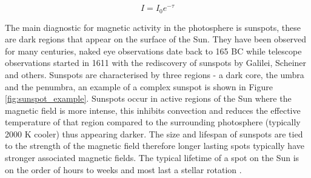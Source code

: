 \begin{equation}
    I = I_{0}e^{-\tau}
    \label{Eq:optical_depth_eq}
\end{equation}

The main diagnostic for magnetic activity in the photosphere is sunspots, these are dark regions that appear on the surface of the Sun. They have been observed for many centuries, naked eye observations date back to 165 BC \citep{Wittmann_1987} while telescope observations started in 1611 with the rediscovery of sunspots by Galilei, Scheiner and others. Sunspots are characterised by three regions - a dark core, the umbra and the penumbra, an example of a complex sunspot is shown in Figure \ref{fig:sunspot_example}. Sunspots occur in active regions of the Sun where the magnetic field is more intense, this inhibits convection and reduces the effective temperature of that region compared to the surrounding photosphere (typically 2000 K cooler) thus appearing darker. The size and lifespan of sunspots are tied to the strength of the magnetic field therefore longer lasting spots typically have stronger associated magnetic fields. The typical lifetime of a spot on the Sun is on the order of hours to weeks and most last a stellar rotation \citep{Bradshaw_Hartigan_2014}.

